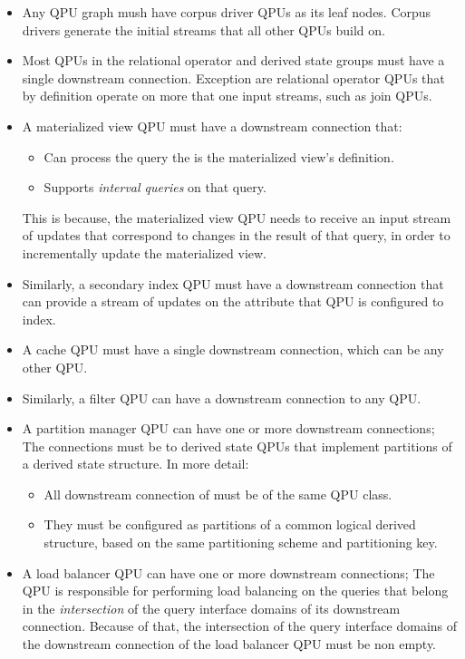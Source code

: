 \begin{itemize}
  \item Any QPU graph mush have corpus driver QPUs as its leaf nodes.
  Corpus drivers generate the initial streams that all other QPUs build on.

  \item Most QPUs in the relational operator and derived state groups must have a single downstream connection.
  Exception are relational operator QPUs that by definition operate on more that one input streams, such as join QPUs.

  \item A materialized view QPU must have a downstream connection that:
  \begin{itemize}
    \item Can process the query the is the materialized view's definition.
    \item Supports \textit{interval queries} on that query.
  \end{itemize}
  This is because, the materialized view QPU needs to receive an input stream of updates that correspond to changes in
  the result of that query, in order to incrementally update the materialized view.

  \item Similarly, a secondary index QPU must have a downstream connection that can provide a stream of updates on the
  attribute that QPU is configured to index.

  \item A cache QPU must have a single downstream connection, which can be any other QPU.

  \item Similarly, a filter QPU can have a downstream connection to any QPU.

  \item A partition manager QPU can have one or more downstream connections;
  The connections must be to derived state QPUs that implement partitions of a derived state structure.
  In more detail:
  \begin{itemize}
    \item All downstream connection of must be of the same QPU class.

    \item They must be configured as partitions of a common logical derived structure, based on the same partitioning
    scheme and partitioning key.
  \end{itemize}

  \item A load balancer QPU can have one or more downstream connections;
  The QPU is responsible for performing load balancing on the queries that belong in the \textit{intersection} of the
  query interface domains of its downstream connection.
  Because of that, the intersection of the query interface domains of the downstream connection of the load balancer
  QPU must be non empty.
\end{itemize}


